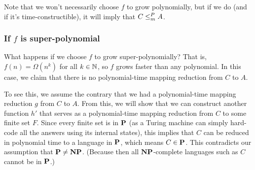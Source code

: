 \documentclass[11pt,twoside=off,numbers=noenddot]{scrbook}
\begin{document}
Note that we won't necessarily choose $f$ to grow polynomially, but if we do (and if it's time-constructible), it will imply that $C \leq_m^P A$.

\subsubsection{If $f$ is super-polynomial}
What happens if we choose $f$ to grow super-polynomially? That is, $f(n) = \Omega(n^k)$ for all $k \in \mathbb N$, so $f$ grows faster than any polynomial. In this case, we claim that there is no polynomial-time mapping reduction from $C$ to $A$.

\begin{proofidea}
  To see this, we assume the contrary that we had a polynomial-time mapping reduction $g$ from $C$ to $A$. From this, we will show that we can construct another function $h'$ that serves as a polynomial-time mapping reduction from $C$ to some finite set $F$. Since every finite set is in $\textbf{P}$ (as a Turing machine can simply hard-code all the answers using its internal states), this implies that $C$ can be reduced in polynomial time to a language in $\textbf{P}$, which means $C \in \textbf{P}$. This contradicts our assumption that $\textbf{P} \neq \textbf{NP}$. (Because then all $\textbf{NP}$-complete languages such as $C$ cannot be in $\textbf{P}$.)
\end{proofidea}
\end{document}
